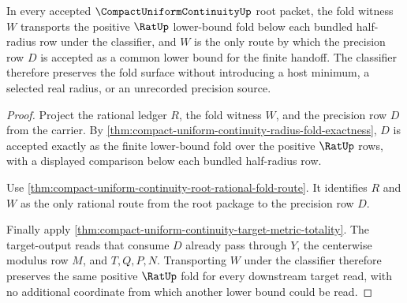 \begin{theorem}
\label{thm:compact-uniform-continuity-fold-witness-stability}
In every accepted $\CompactUniformContinuityUp$ root packet, the fold witness $W$ transports the positive $\RatUp$ lower-bound fold below each bundled half-radius row under the classifier, and $W$ is the only route by which the precision row $D$ is accepted as a common lower bound for the finite handoff. The classifier therefore preserves the fold surface without introducing a host minimum, a selected real radius, or an unrecorded precision source.
\end{theorem}
\begin{proof}
Project the rational ledger $R$, the fold witness $W$, and the precision row $D$ from the carrier. By \autoref{thm:compact-uniform-continuity-radius-fold-exactness}, $D$ is accepted exactly as the finite lower-bound fold over the positive $\RatUp$ rows, with a displayed comparison below each bundled half-radius row.

Use \autoref{thm:compact-uniform-continuity-root-rational-fold-route}. It identifies $R$ and $W$ as the only rational route from the root package to the precision row $D$.

Finally apply \autoref{thm:compact-uniform-continuity-target-metric-totality}. The target-output reads that consume $D$ already pass through $Y$, the centerwise modulus row $M$, and $T,Q,P,N$. Transporting $W$ under the classifier therefore preserves the same positive $\RatUp$ fold for every downstream target read, with no additional coordinate from which another lower bound could be read.
\end{proof}

